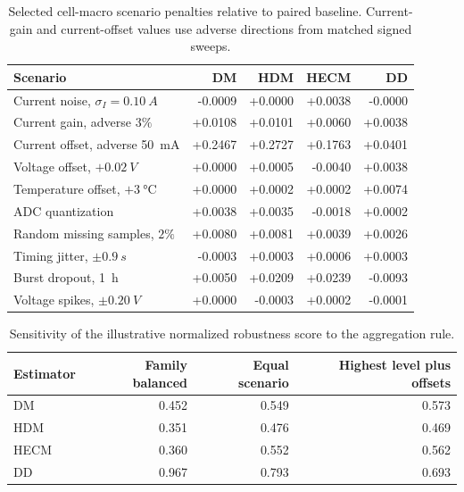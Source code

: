 \begin{table}[H]
\centering
\footnotesize
\caption[Selected disturbance penalties.]{Selected cell-macro scenario penalties relative to paired baseline. Current-gain and current-offset values use adverse directions from matched signed sweeps.}
\label{tab:robustness_appendix_key_results}
\begin{tabular}{lrrrr}
\toprule
Scenario & DM & HDM & HECM & DD \\
\midrule
Current noise, $\sigma_I=\SI{0.10}{A}$ & -0.0009 & +0.0000 & +0.0038 & -0.0000 \\
Current gain, adverse $3\%$ & +0.0108 & +0.0101 & +0.0060 & +0.0038 \\
Current offset, adverse \SI{50}{\milli\ampere} & +0.2467 & +0.2727 & +0.1763 & +0.0401 \\
Voltage offset, $+\SI{0.02}{V}$ & +0.0000 & +0.0005 & -0.0040 & +0.0038 \\
Temperature offset, $+\SI{3}{\celsius}$ & +0.0000 & +0.0002 & +0.0002 & +0.0074 \\
ADC quantization & +0.0038 & +0.0035 & -0.0018 & +0.0002 \\
Random missing samples, $2\%$ & +0.0080 & +0.0081 & +0.0039 & +0.0026 \\
Timing jitter, $\pm\SI{0.9}{s}$ & -0.0003 & +0.0003 & +0.0006 & +0.0003 \\
Burst dropout, \SI{1}{h} & +0.0050 & +0.0209 & +0.0239 & -0.0093 \\
Voltage spikes, $\pm\SI{0.20}{V}$ & +0.0000 & -0.0003 & +0.0002 & -0.0001 \\
\bottomrule
\end{tabular}
\end{table}

\begin{table}[H]
\centering
\footnotesize
\caption[Robustness-score sensitivity.]{Sensitivity of the illustrative normalized robustness score to the aggregation rule.}
\label{tab:robustness_appendix_score_sensitivity}
\begin{tabular}{lrrr}
\toprule
Estimator & Family balanced & Equal scenario & Highest level plus offsets \\
\midrule
DM   & 0.452 & 0.549 & 0.573 \\
HDM  & 0.351 & 0.476 & 0.469 \\
HECM & 0.360 & 0.552 & 0.562 \\
DD   & 0.967 & 0.793 & 0.693 \\
\bottomrule
\end{tabular}
\end{table}


